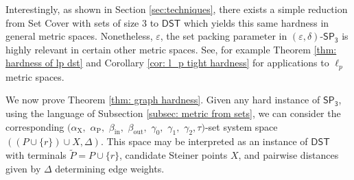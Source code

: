 \documentclass{article}\providecommand{\DeclareRedundantLanguages}[2]{}\usepackage[a4paper,margin=20mm]{geometry}
\newcommand{\1}{\textbf{1}}
\newcommand{\setpT}{$\mathsf{SP_3}$\xspace}
\newcommand{\dst}{$\mathsf{DST}$\xspace}
\newcommand{\td}{\tau}
\newcommand{\srd}{\alpha_{\text{X}}}
\newcommand{\trd}{\alpha_{\text{P}}}
\renewcommand{\tilde}{\widetilde}
\begin{document}
\begin{remark}
Interestingly, as shown in Section \ref{sec:techniques}, there exists a simple reduction from Set Cover with sets of size $3$ to \dst which yields this same hardness in general metric spaces. Nonetheless, $\varepsilon$, the set packing parameter in $(\varepsilon, \delta)$-\setpT is highly relevant in certain other metric spaces. See, for example Theorem \ref{thm: hardness of lp dst} and Corollary \ref{cor: l_p tight hardness} for applications to $\ell_p$ metric spaces.
\end{remark}



We now prove Theorem \ref{thm: graph hardness}. Given any hard instance of \setpT, using the language of Subsection \ref{subsec: metric from sets}, we can consider the corresponding $(\srd,$ $\trd,$ $\beta_{\text{in}},$ $\beta_{\text{out}},$ $\gamma_0,$ $\gamma_1,$ $\gamma_2,\td)$-set system space $((P \cup \{r\})\cup X, \Delta)$. This space may be interpreted as an instance of \dst with terminals $\tilde{P} = P \cup \{r\}$, candidate Steiner points $X$, and pairwise distances given by $\Delta$ determining edge weights. 
\end{document}
